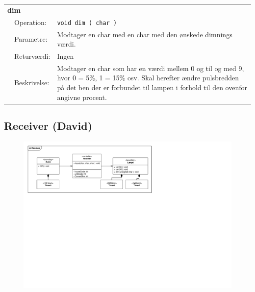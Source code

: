 \clearpage

\begin{table}[h]
\begin{tabularx}{\textwidth}{p{0.6 cm} l X} %

\multicolumn{3}{l}{\textbf{dim}}\\
& Operation: & %
\texttt{void dim ( char )}
\\ & Parametre: & %
Modtager en char med en char med den ønskede dimnings værdi.
\\ & Returværdi: & %
Ingen
\\ & Beskrivelse: & %
Modtager en char som har en værdi mellem 0 og til og med 9, hvor 0 = 5\%, 1 = 15\% osv. Skal herefter ændre pulsbredden på det ben der er forbundet til lampen i forhold til den ovenfor angivne procent.
\\ \end{tabularx}
\end{table}

\subsection{Receiver (David)}

\begin{figure}[h]
\centering
\includegraphics[scale=1,clip=true, trim=198 440 527 50]{Systemarkitektur/diagrammer/Receiver_KlasseDiagram} %
\end{figure}

